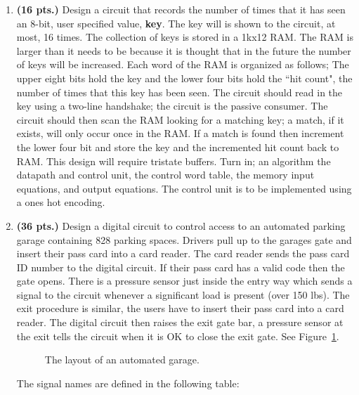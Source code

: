 \begin{enumerate}
\item \textbf{ (16 pts.)} Design a circuit that records the number of times that it
has seen an 8-bit, user specified value, \textbf{ key}.  The key will
is shown to the circuit, at most, 16 times.  The collection of 
keys is stored in a 1kx12 RAM.  The RAM is larger
than it needs to be because it is thought that in the future
the number of keys will be increased.  Each word of the RAM is 
organized as follows; The upper eight bits hold the key and the lower
four bits hold the ``hit count", the number of times that this key has
been seen.  The circuit should read in the key using a two-line
handshake; the circuit is the passive consumer.  The circuit
should then scan the RAM looking for a matching key; a match, if
it exists, will only occur once in the RAM.  If a match is 
found then increment the lower four bit and store the key and the
incremented hit count back to RAM.  This design will require tristate 
buffers.
Turn in; an algorithm
the datapath and control unit,
the control word table,
the memory input equations, and
output equations.  
The control unit is to be implemented using a ones hot encoding.

\item \textbf{ (36 pts.)}
Design a digital circuit to control access to an
automated parking garage containing 828 parking spaces.  
Drivers pull up to the garages gate and insert 
their pass card into a card reader.  The card reader sends the pass card
ID number to the digital circuit.  If their pass card has a valid
code then the gate opens.  There is a pressure sensor just inside the
entry way which sends a signal to the circuit whenever a significant
load is present (over 150 lbs).
The exit procedure is similar, the users have to insert their pass card
into a card reader.  The digital circuit then raises the exit gate bar,
a pressure sensor at the exit tells the circuit when it is OK to close
the exit gate.  See Figure~\ref{fig:Garage}.
\begin{figure}[ht]
\caption{The layout of an automated garage.}
\label{fig:Garage}
\end{figure}

The signal names are defined in the following table:


\end{enumerate}
